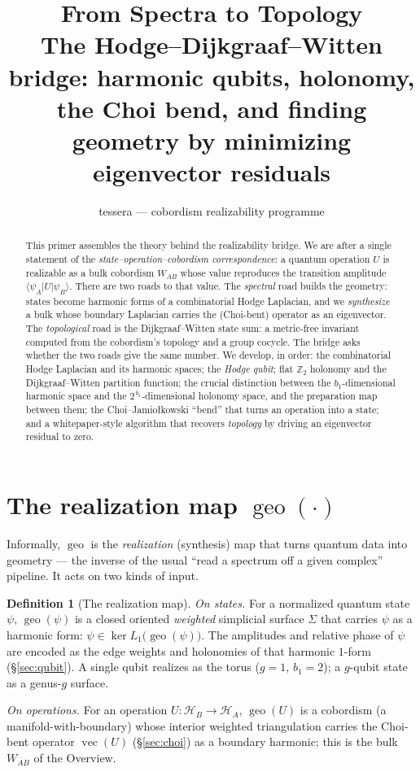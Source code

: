 \documentclass[11pt]{article}
\title{\textbf{From Spectra to Topology}\\[2pt]
\large The Hodge--Dijkgraaf--Witten bridge: harmonic qubits, holonomy,\\
the Choi bend, and finding geometry by minimizing eigenvector residuals}
\author{tessera --- cobordism realizability programme}
\date{}
\theoremstyle{plain}
\theoremstyle{definition}
\newtheorem{definition}{Definition}
\theoremstyle{remark}
\newcommand{\Z}{\mathbb{Z}}
\newcommand{\HH}{\mathcal{H}}
\newcommand{\vecop}{\operatorname{vec}}
\newcommand{\ip}[3]{\langle #1 \vert #2 \vert #3 \rangle}
\newcommand{\geo}{\operatorname{geo}}
\newcommand{\WAB}{W_{\!AB}}
\begin{document}
\maketitle

\begin{abstract}
\noindent
This primer assembles the theory behind the realizability bridge. We are after a
single statement of the \emph{state--operation--cobordism correspondence}: a
quantum operation $U$ is realizable as a bulk cobordism $\WAB$ whose value
reproduces the transition amplitude $\ip{\psi_A}{U}{\psi_B}$. There are two
roads to that value. The \emph{spectral} road builds the geometry: states become
harmonic forms of a combinatorial Hodge Laplacian, and we \emph{synthesize} a
bulk whose boundary Laplacian carries the (Choi-bent) operator as an eigenvector.
The \emph{topological} road is the Dijkgraaf--Witten state sum: a metric-free
invariant computed from the cobordism's topology and a group cocycle. The bridge
asks whether the two roads give the same number. We develop, in order: the
combinatorial Hodge Laplacian and its harmonic spaces; the \emph{Hodge qubit};
flat $\Z_2$ holonomy and the Dijkgraaf--Witten partition function; the crucial
distinction between the $b_1$-dimensional harmonic space and the
$2^{\,b_1}$-dimensional holonomy space, and the preparation map between them; the
Choi--Jamio\l kowski ``bend'' that turns an operation into a state; and a
whitepaper-style algorithm that recovers \emph{topology} by driving an
eigenvector residual to zero.
\end{abstract}

\tableofcontents
\bigskip

\section{The realization map \texorpdfstring{$\geo(\cdot)$}{geo}}\label{sec:geo}

Informally, $\geo$ is the \emph{realization} (synthesis) map that
turns quantum data into geometry --- the inverse of the usual ``read a spectrum
off a given complex'' pipeline. It acts on two kinds of input.

\begin{definition}[The realization map]\label{def:geo}
\emph{On states.} For a normalized quantum state $\psi$, $\geo(\psi)$ is a closed
oriented \emph{weighted} simplicial surface $\Sigma$ that carries $\psi$ as a
harmonic form: $\psi \in \ker L_1\big(\geo(\psi)\big)$. The amplitudes and
relative phase of $\psi$ are encoded as the edge weights and holonomies of that
harmonic $1$-form (\S\ref{sec:qubit}). A single qubit realizes as the torus
($g=1$, $b_1=2$); a $g$-qubit state as a genus-$g$ surface.

\emph{On operations.} For an operation $U:\HH_B\!\to\!\HH_A$, $\geo(U)$ is a
cobordism (a manifold-with-boundary) whose interior weighted triangulation
carries the Choi-bent operator $\vecop(U)$ (\S\ref{sec:choi}) as a boundary
harmonic; this is the bulk $\WAB$ of the Overview.
\end{definition}
\end{document}
